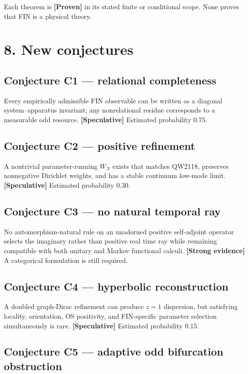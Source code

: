 \documentclass[11pt,a4paper,openany]{report}
\newcommand{\statusProven}{\textcolor{fingreen}{[Proven]}}
\newcommand{\statusStrong}{\textcolor{finblue}{[Strong evidence]}}
\newcommand{\statusSpeculative}{\textcolor{finorange}{[Speculative]}}
\begin{document}
Each theorem is \textbf{\statusProven{}} in its stated finite or conditional scope. None proves that FIN is a physical theory.

\section{8. New conjectures}

\subsection{Conjecture C1 — relational completeness}

Every empirically admissible FIN observable can be written as a diagonal system–apparatus invariant; any nonrelational residue corresponds to a measurable odd resource. \textbf{\statusSpeculative{}} Estimated probability \(0.75\).

\subsection{Conjecture C2 — positive refinement}

A nontrivial parameter-running \(W_N\) exists that matches QW2118, preserves nonnegative Dirichlet weights, and has a stable continuum low-mode limit. \textbf{\statusSpeculative{}} Estimated probability \(0.30\).

\subsection{Conjecture C3 — no natural temporal ray}

No automorphism-natural rule on an unadorned positive self-adjoint operator selects the imaginary rather than positive real time ray while remaining compatible with both unitary and Markov functional calculi. \textbf{\statusStrong{}} A categorical formulation is still required.

\subsection{Conjecture C4 — hyperbolic reconstruction}

A doubled graph-Dirac refinement can produce \(z=1\) dispersion, but satisfying locality, orientation, OS positivity, and FIN-specific parameter selection simultaneously is rare. \textbf{\statusSpeculative{}} Estimated probability \(0.15\).

\subsection{Conjecture C5 — adaptive odd bifurcation obstruction}
\end{document}
